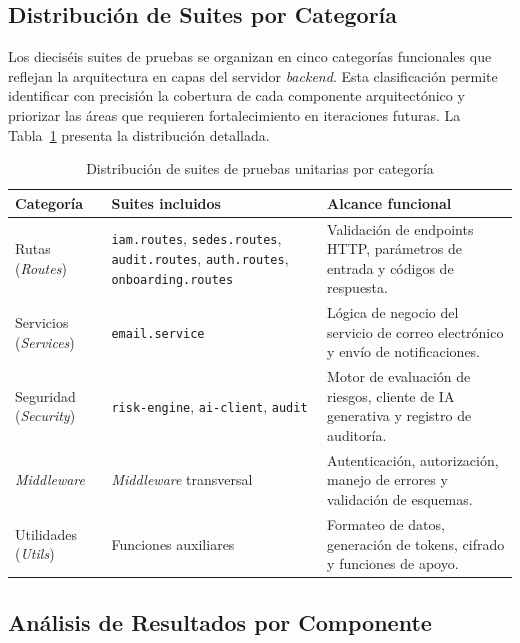 \subsection{Distribuci\'on de Suites por Categor\'ia}
\label{subsec:distribucion-suites}

Los diecis\'eis suites de pruebas se organizan en cinco categor\'ias funcionales
que reflejan la arquitectura en capas del servidor \textit{backend}. Esta
clasificaci\'on permite identificar con precisi\'on la cobertura de cada
componente arquitect\'onico y priorizar las \'areas que requieren
fortalecimiento en iteraciones futuras. La Tabla~\ref{tab:suites-categoria}
presenta la distribuci\'on detallada.

\begin{table}[htbp]
\centering
\caption{Distribuci\'on de suites de pruebas unitarias por categor\'ia}
\label{tab:suites-categoria}
\begin{tabular}{|l|p{6.5cm}|p{4.5cm}|}
\hline
\textbf{Categor\'ia} & \textbf{Suites incluidos} & \textbf{Alcance funcional} \\
\hline
Rutas (\textit{Routes}) & \texttt{iam.routes}, \texttt{sedes.routes}, \texttt{audit.routes}, \texttt{auth.routes}, \texttt{onboarding.routes} & Validaci\'on de endpoints HTTP, par\'ametros de entrada y c\'odigos de respuesta. \\
\hline
Servicios (\textit{Services}) & \texttt{email.service} & L\'ogica de negocio del servicio de correo electr\'onico y env\'io de notificaciones. \\
\hline
Seguridad (\textit{Security}) & \texttt{risk-engine}, \texttt{ai-client}, \texttt{audit} & Motor de evaluaci\'on de riesgos, cliente de IA generativa y registro de auditor\'ia. \\
\hline
\textit{Middleware} & \textit{Middleware} transversal & Autenticaci\'on, autorizaci\'on, manejo de errores y validaci\'on de esquemas. \\
\hline
Utilidades (\textit{Utils}) & Funciones auxiliares & Formateo de datos, generaci\'on de tokens, cifrado y funciones de apoyo. \\
\hline
\end{tabular}
\end{table}

\subsection{An\'alisis de Resultados por Componente}
\label{subsec:analisis-unitarias}

